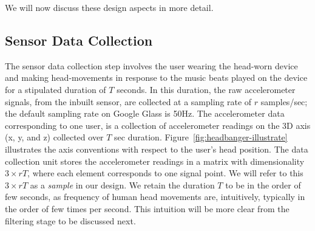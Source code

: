 We will now discuss these design aspects in more detail.
\subsection{Sensor Data Collection}

The sensor data collection step involves the user wearing
the head-worn device and making head-movements in response to
the music beats played on the device for a stipulated duration of $T$ seconds.
In this duration, the raw accelerometer
signals, from the inbuilt sensor, are collected at
a sampling rate of $r$ samples/sec; the default sampling rate on
Google Glass is 50Hz. The accelerometer data corresponding to one user,  is a 
collection of accelerometer readings on the
3D axis (x, y, and z) collected over $T$ sec duration. 
Figure~\ref{fig:headbanger-illustrate} illustrates the axis 
conventions with respect to the user's head position. 
The data collection unit stores the accelerometer readings in a
matrix with dimensionality $3\times rT$, where each element corresponds
to one signal point. We will refer to this $3\times rT$ as a {\em sample} in 
our design. 
We retain the duration $T$ to be in the order of few seconds, as frequency of 
human head movements are, intuitively, typically in the order of few times per 
second. This intuition will be more clear from the filtering stage to be 
discussed next.


